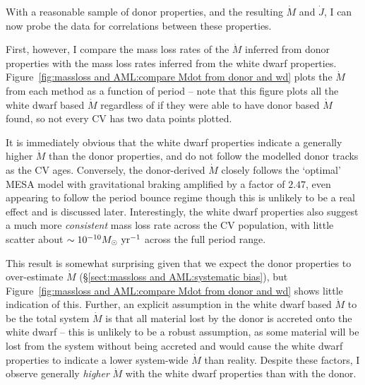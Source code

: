 \label{chpt:discussion} %

With a reasonable sample of donor properties, and the resulting $\dot M$ and $\dot J$, I can now probe the data for correlations between these properties.

First, however, I compare the mass loss rates of the $\dot M$ inferred from donor properties with the mass loss rates inferred from the white dwarf properties.
Figure~\ref{fig:massloss and AML:compare Mdot from donor and wd} plots the $\dot M$ from each method as a function of period -- note that this figure plots all the white dwarf based $\dot M$ regardless of if they were able to have donor based $\dot M$ found, so not every CV has two data points plotted.

It is immediately obvious that the white dwarf properties indicate a generally higher $\dot M$ than the donor properties, and do not follow the modelled donor tracks as the CV ages.
Conversely, the donor-derived $\dot M$ closely follows the `optimal' MESA model with gravitational braking amplified by a factor of $2.47$, even appearing to follow the period bounce regime though this is unlikely to be a real effect and is discussed later.
Interestingly, the white dwarf properties also suggest a much more \textit{consistent} mass loss rate across the CV population, with little scatter about $\sim 10^{-10} M_\odot~{\rm yr}^{-1}$ across the full period range.

This result is somewhat surprising given that we expect the donor properties to over-estimate $\dot M$ (\S\ref{sect:massloss and AML:systematic bias}), but Figure~\ref{fig:massloss and AML:compare Mdot from donor and wd} shows little indication of this.
Further, an explicit assumption in the white dwarf based $\dot M$ to be the total system $\dot M$ is that all material lost by the donor is accreted onto the white dwarf -- this is unlikely to be a robust assumption, as some material will be lost from the system without being accreted and would cause the white dwarf properties to indicate a lower system-wide $\dot M$ than reality.
Despite these factors, I observe generally \textit{higher} $\dot M$ with the white dwarf properties than with the donor.

